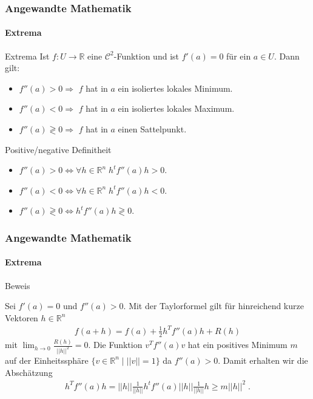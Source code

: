 \documentclass{beamer}
\begin{document}
\begin{frame}
    \frametitle{Angewandte Mathematik}
\framesubtitle{Extrema}
    \begin{block}{Extrema}
 Ist $f: U  \to \mathbb{R}$ eine $\mathcal{C}^2$-Funktion und ist $f'(a) = 0$ für ein $a \in U$. Dann gilt:
\begin{itemize}
\item $f''(a) > 0 \Rightarrow $ $f$ hat in $a$ ein isoliertes lokales Minimum.
\item $f''(a) < 0 \Rightarrow $ $f$ hat in $a$ ein isoliertes lokales Maximum.
\item $f''(a) \gtrless 0 \Rightarrow $ $f$ hat in $a$ einen Sattelpunkt.
\end{itemize} 
\end{block}

\begin{block}{Positive/negative Definitheit}
   \begin{itemize}
   \item $f''(a) > 0 \Leftrightarrow \forall h \in \mathbb{R}^n \; h^t f''(a) h > 0$.
   \item $f''(a) < 0 \Leftrightarrow \forall h \in \mathbb{R}^n \; h^t f''(a) h < 0$.
   \item $f''(a) \gtrless 0 \Leftrightarrow h^t f''(a) h \gtrless 0$.
   \end{itemize} 
   \end{block}

 \end{frame}


\begin{frame}
    \frametitle{Angewandte Mathematik}
\framesubtitle{Extrema}
    \begin{block}{Beweis}

Sei $f'(a) = 0$ und $f''(a) > 0$. Mit der Taylorformel gilt für hinreichend kurze Vektoren $h \in \mathbb{R}^n$
\begin{align*}
f(a + h) = f(a) + \frac{1}{2} h^T f''(a) h + R(h)
\end{align*}
mit $\lim_{h \to 0} \frac{R(h)}{ ||h||^2} = 0$. 
Die Funktion $v^T f''(a) v $ hat ein positives Minimum  $m$ auf der Einheitssphäre $\{ v \in \mathbb{R}^n \; | \; ||v|| = 1 \}$ da $f''(a) > 0$.
Damit erhalten wir die Abschätzung
\begin{align*}
 h^T f''(a) h  = ||h|| \frac{1}{||h||} h^t  f''(a)  ||h|| \frac{1}{||h||} h \geq m ||h||^2 \;.
\end{align*}
\end{block}
 \end{frame}
\end{document}

